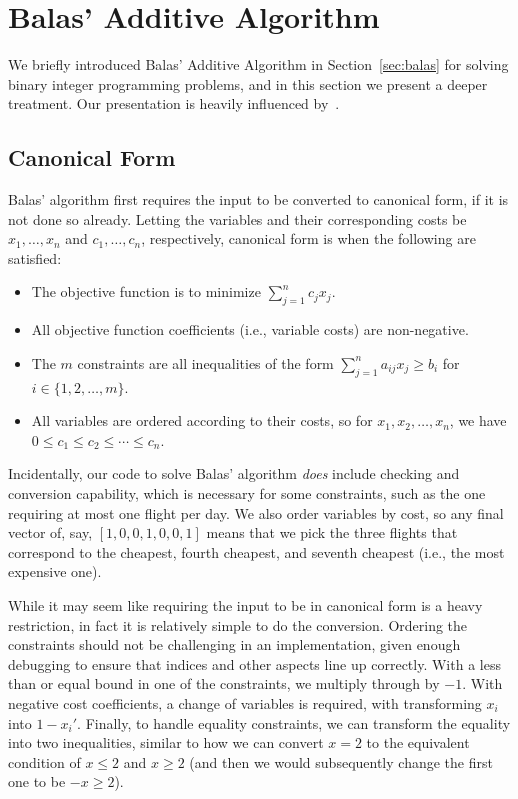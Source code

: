 \documentclass{article}
\begin{document}
\newpage
\section{Balas' Additive Algorithm}\label{app:balas}

We briefly introduced Balas' Additive Algorithm in Section~\ref{sec:balas} for solving binary integer programming problems, and in this section we
present a deeper treatment. Our presentation is heavily influenced by~\cite{carleton}.

\subsection{Canonical Form}

Balas' algorithm first requires the input to be converted to canonical form, if it is not done so already. Letting the variables and their
corresponding costs be $x_1, \ldots, x_n$ and $c_1, \ldots, c_n$, respectively, canonical form is when the following are satisfied:

\begin{itemize}[noitemsep]
    \item The objective function is to minimize $\sum_{j=1}^n c_jx_j$.
    \item All objective function coefficients (i.e., variable costs) are non-negative. 
    \item The $m$ constraints are all inequalities of the form $\sum_{j=1}^{n} a_{ij}x_j \ge b_i$ for $i \in \{1,2,\ldots,m\}$.
    \item All variables are ordered according to their costs, so for $x_1, x_2, \ldots, x_n$, we have $0 \le c_1 \le c_2 \le \cdots \le c_n$. 
\end{itemize}

Incidentally, our code to solve Balas' algorithm \emph{does} include checking and conversion capability, which is necessary for some constraints, such
as the one requiring at most one flight per day. We also order variables by cost, so any final vector of, say, $[1,0,0,1,0,0,1]$ means that we pick
the three flights that correspond to the cheapest, fourth cheapest, and seventh cheapest (i.e., the most expensive one).

While it may seem like requiring the input to be in canonical form is a heavy restriction, in fact it is relatively simple to do the conversion.
Ordering the constraints should not be challenging in an implementation, given enough debugging to ensure that indices and other aspects line up
correctly. With a less than or equal bound in one of the constraints, we multiply through by $-1$. With negative cost coefficients, a change of
variables is required, with transforming $x_i$ into $1-x_i'$. Finally, to handle equality constraints, we can transform the equality into two
inequalities, similar to how we can convert $x=2$ to the equivalent condition of $x\le2$ and $x\ge2$ (and then we would subsequently change the first
one to be $-x\ge2$).
\end{document}

